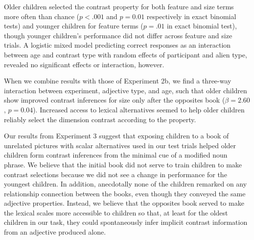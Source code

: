 \documentclass[10pt,letterpaper]{article}
\begin{document}
Older children selected the contrast property for both feature and size terms more often than chance ($p < .001$ and $p = 0.01$ respectively in exact binomial tests) and younger children for feature terms ($p = .01$ in exact binomial test), though younger children's performance did not differ across feature and size trials.  A logistic mixed model predicting correct responses as an interaction between age and contrast type with random effects of participant and alien type, revealed no significant effects or interaction, however.

When we combine results with those of Experiment 2b, we find a three-way interaction between experiment, adjective type, and age, such that older children show improved contrast inferences for size only after the opposites book ($\beta = 2.60$, $p = 0.04$).  Increased access to lexical alternatives seemed to help older children reliably select the dimension contrast according to the property.  

Our results from Experiment 3 suggest that exposing children to a book of unrelated pictures with scalar alternatives used in our test trials helped older children form contrast inferences from the minimal cue of a modified noun phrase.  We believe that the initial book did not serve to train children to make contrast selections because we did not see a change in performance for the youngest children.  In addition, anecdotally none of the children remarked on any relationship connection between the books, even though they conveyed the same adjective properties.  Instead, we believe that the opposites book served to make the lexical scales more accessible to children so that, at least for the oldest children in our task, they could spontaneously infer implicit contrast information from an adjective produced alone.   

\end{document}
